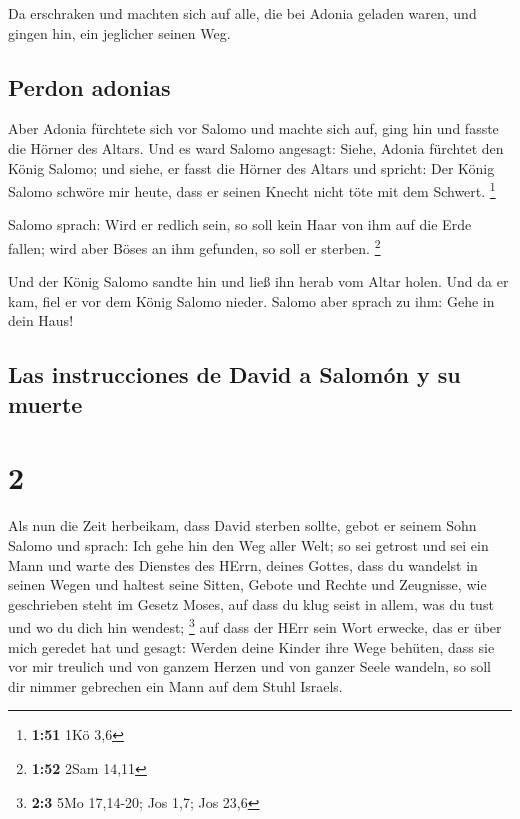  Da erschraken und machten sich auf alle, die bei Adonia
geladen waren, und gingen hin, ein jeglicher seinen Weg.

\hypertarget{perdon-adonias}{%
\subsection{Perdon adonias}\label{perdon-adonias}}

 Aber Adonia fürchtete sich vor Salomo und machte sich
auf, ging hin und fasste die Hörner des Altars.  Und es
ward Salomo angesagt: Siehe, Adonia fürchtet den König Salomo; und
siehe, er fasst die Hörner des Altars und spricht: Der König Salomo
schwöre mir heute, dass er seinen Knecht nicht töte mit dem Schwert.
\footnote{\textbf{1:51} 1Kö 3,6}

 Salomo sprach: Wird er redlich sein, so soll kein Haar
von ihm auf die Erde fallen; wird aber Böses an ihm gefunden, so soll er
sterben. \footnote{\textbf{1:52} 2Sam 14,11}

 Und der König Salomo sandte hin und ließ ihn herab vom
Altar holen. Und da er kam, fiel er vor dem König Salomo nieder. Salomo
aber sprach zu ihm: Gehe in dein Haus!

\hypertarget{las-instrucciones-de-david-a-salomuxf3n-y-su-muerte}{%
\subsection{Las instrucciones de David a Salomón y su
muerte}\label{las-instrucciones-de-david-a-salomuxf3n-y-su-muerte}}

\hypertarget{section-1}{%
\section{2}\label{section-1}}

 Als nun die Zeit herbeikam, dass David sterben sollte,
gebot er seinem Sohn Salomo und sprach:  Ich gehe hin den
Weg aller Welt; so sei getrost und sei ein Mann  und warte
des Dienstes des HErrn, deines Gottes, dass du wandelst in seinen Wegen
und haltest seine Sitten, Gebote und Rechte und Zeugnisse, wie
geschrieben steht im Gesetz Moses, auf dass du klug seist in allem, was
du tust und wo du dich hin wendest; \footnote{\textbf{2:3} 5Mo 17,14-20;
  Jos 1,7; Jos 23,6}  auf dass der HErr sein Wort erwecke,
das er über mich geredet hat und gesagt: Werden deine Kinder ihre Wege
behüten, dass sie vor mir treulich und von ganzem Herzen und von ganzer
Seele wandeln, so soll dir nimmer gebrechen ein Mann auf dem Stuhl
Israels.

